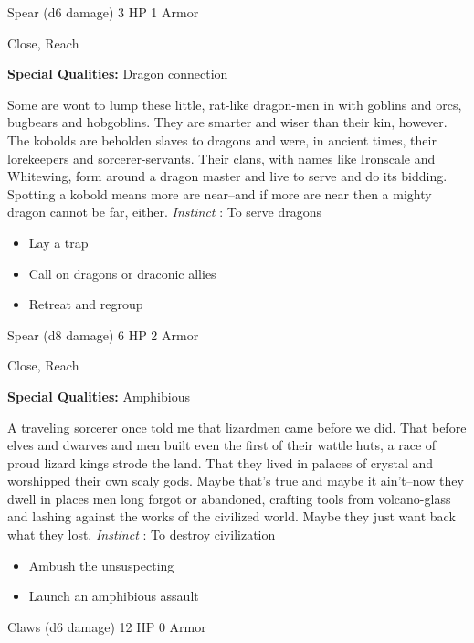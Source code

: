 

 Spear (d6 damage) 3 HP 1 Armor


 Close, Reach


 \textbf{Special Qualities:}
 Dragon connection


 Some are wont to lump these little, rat-like dragon-men in with goblins and orcs, bugbears and hobgoblins. They are smarter and wiser than their kin, however. The kobolds are beholden slaves to dragons and were, in ancient times, their lorekeepers and sorcerer-servants. Their clans, with names like Ironscale and Whitewing, form around a dragon master and live to serve and do its bidding. Spotting a kobold means more are near--and if more are near then a mighty dragon cannot be far, either. \emph{Instinct}
: To serve dragons
\begin{itemize}
\item Lay a trap
\item Call on dragons or draconic allies
\item Retreat and regroup

\end{itemize}




 Spear (d8 damage) 6 HP 2 Armor


 Close, Reach


 \textbf{Special Qualities:}
 Amphibious


 A traveling sorcerer once told me that lizardmen came before we did. That before elves and dwarves and men built even the first of their wattle huts, a race of proud lizard kings strode the land. That they lived in palaces of crystal and worshipped their own scaly gods. Maybe that's true and maybe it ain't--now they dwell in places men long forgot or abandoned, crafting tools from volcano-glass and lashing against the works of the civilized world. Maybe they just want back what they lost. \emph{Instinct}
: To destroy civilization
\begin{itemize}
\item Ambush the unsuspecting
\item Launch an amphibious assault

\end{itemize}




 Claws (d6 damage) 12 HP 0 Armor


